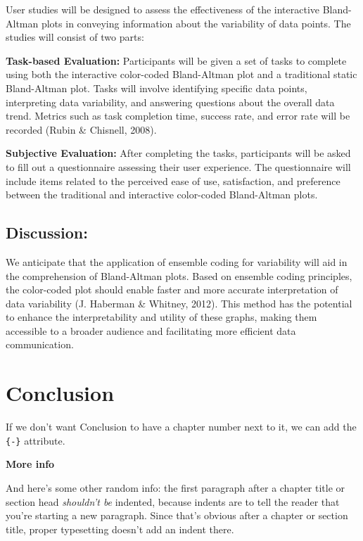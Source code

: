 \documentclass[print]{nuthesis}
\begin{document}
User studies will be designed to assess the effectiveness of the interactive Bland-Altman plots in conveying information about the variability of data points.
The studies will consist of two parts:

\textbf{Task-based Evaluation:} Participants will be given a set of tasks to complete using both the interactive color-coded Bland-Altman plot and a traditional static Bland-Altman plot.
Tasks will involve identifying specific data points, interpreting data variability, and answering questions about the overall data trend.
Metrics such as task completion time, success rate, and error rate will be recorded (Rubin \& Chisnell, 2008).

\textbf{Subjective Evaluation:} After completing the tasks, participants will be asked to fill out a questionnaire assessing their user experience.
The questionnaire will include items related to the perceived ease of use, satisfaction, and preference between the traditional and interactive color-coded Bland-Altman plots.

\hypertarget{discussion-1}{%
\section{Discussion:}\label{discussion-1}}

We anticipate that the application of ensemble coding for variability will aid in the comprehension of Bland-Altman plots.
Based on ensemble coding principles, the color-coded plot should enable faster and more accurate interpretation of data variability (J. Haberman \& Whitney, 2012).
This method has the potential to enhance the interpretability and utility of these graphs, making them accessible to a broader audience and facilitating more efficient data communication.

\hypertarget{conclusion-1}{%
\chapter*{Conclusion}\label{conclusion-1}}

If we don't want Conclusion to have a chapter number next to it, we can add the \texttt{\{-\}} attribute.

\textbf{More info}

And here's some other random info: the first paragraph after a chapter title or section head \emph{shouldn't be} indented, because indents are to tell the reader that you're starting a new paragraph. Since that's obvious after a chapter or section title, proper typesetting doesn't add an indent there.
\end{document}
